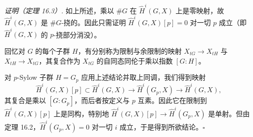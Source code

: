 \textit{证明（定理 16.3）.} 如上所述，乘以 $\#G$ 在 $\widehat H^i(G,X)$ 上是零映射，故 $\widehat H^i(G,X)$ 是 $\#G$-挠的。因此只需证明 $\widehat H^i(G,X)[p]=0$ 对一切 $p$ 成立（即 $\widehat H^i(G,X)$ 的 $p$-挠部分消没）。

回忆对 $G$ 的每个子群 $H$，有分别称为限制与余限制的映射 $X_{tG}\to X_{tH}$ 与 $X_{tH}\to X_{tG}$，其复合作为 $X_{tG}$ 的自同态同伦于乘以指数 $[G:H]$。%

对 $p$-Sylow 子群 $H=G_p$ 应用上述结论并取上同调，我们得到映射
\[
\widehat H^i(G,X)[p]\subset \widehat H^i(G,X)\to \widehat H^i(G_p,X)\to \widehat H^i(G,X),
\]
其复合是乘以 $[G:G_p]$，而后者按定义与 $p$ 互素。因此它在限制到 $\widehat H^i(G,X)[p]$ 上是同构，特别地 $\widehat H^i(G,X)[p]\to\widehat H^i(G_p,X)$ 是单射。但由定理 16.2，$\widehat H^i(G_p,X)=0$ 对一切 $i$ 成立，于是得到所欲结论。\hfill$\square$

